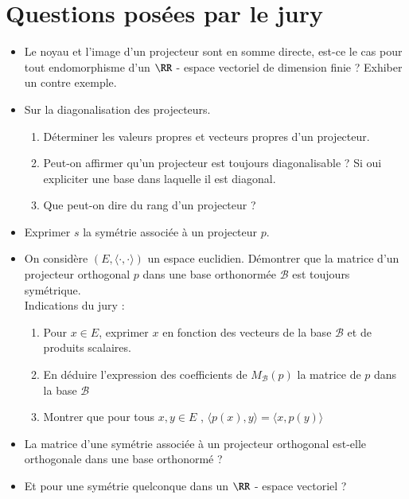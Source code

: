 \documentclass[oneside,12pt]{article}
\begin{document}
\newpage
\section*{Questions posées par le jury}
\begin{itemize}[label=$\bullet$]
	\item Le noyau et l'image d'un projecteur sont en somme directe, est-ce le cas pour tout endomorphisme d'un $\RR$ - espace vectoriel de dimension finie ? Exhiber un contre exemple.
	\item Sur la diagonalisation des projecteurs.
		\begin{enumerate}
			\item Déterminer les valeurs propres et vecteurs propres d'un projecteur.
			\item Peut-on affirmer qu'un projecteur est toujours diagonalisable ? Si oui expliciter une base dans laquelle il est diagonal.
			\item Que peut-on dire du rang d'un projecteur ?
		\end{enumerate}
	\item Exprimer $s$ la symétrie associée à un projecteur $p$.
	\item On considère $(E,\langle \cdot , \cdot \rangle)$  un espace euclidien. Démontrer que la matrice d'un projecteur orthogonal $p$ dans une base orthonormée $\mathcal{B}$ est toujours symétrique. \\
	Indications du jury : 
	\begin{enumerate}
		\item Pour $x\in E$, exprimer $x$ en fonction des vecteurs de la base $\mathcal{B}$ et de produits scalaires.
		\item En déduire l'expression des coefficients de $M_{\mathcal{B}}(p)$ la matrice de $p$ dans la base $\mathcal{B}$
		\item Montrer que pour tous $x,y\in E$ , $\langle p(x),y \rangle = \langle x,p(y) \rangle$
	\end{enumerate}
	\item La matrice d'une symétrie associée à un projecteur orthogonal est-elle orthogonale dans une base orthonormé ?
	\item Et pour une symétrie quelconque dans un $\RR$ - espace vectoriel ?
\end{itemize}
\end{document}
